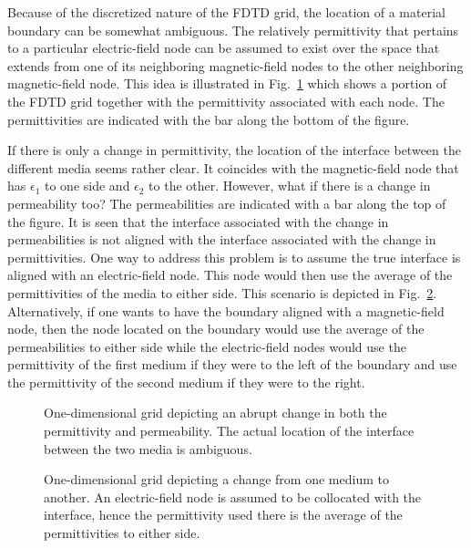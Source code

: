 Because of the discretized nature of the FDTD grid, the location of a
material boundary can be somewhat ambiguous.  The relatively
permittivity that pertains to a particular electric-field node can be
assumed to exist over the space that extends from one of its
neighboring magnetic-field nodes to the other neighboring
magnetic-field node.  This idea is illustrated in Fig.\
\ref{fig:abrupt} which shows a portion of the FDTD grid together with
the permittivity associated with each node.  The permittivities are
indicated with the bar along the bottom of the figure.  

If there is only a change in permittivity, the location of the
interface between the different media seems rather clear.  It
coincides with the magnetic-field node that has $\epsilon_1$ to one
side and $\epsilon_2$ to the other.  However, what if there is a
change in permeability too?  The permeabilities are indicated with a
bar along the top of the figure.  It is seen that the interface
associated with the change in permeabilities is not aligned with the
interface associated with the change in permittivities.  One way to
address this problem is to assume the true interface is aligned with
an electric-field node.  This node would then use the average of the
permittivities of the media to either side.  This scenario is depicted
in Fig.\ \ref{fig:average}.  Alternatively, if one wants to have the
boundary aligned with a magnetic-field node, then the node located on
the boundary would use the average of the permeabilities to either
side while the electric-field nodes would use the permittivity of the
first medium if they were to the left of the boundary and use the
permittivity of the second medium if they were to the right.

\begin{figure}
  \begin{center}
  \end{center}
  \caption{One-dimensional grid depicting an abrupt change in both the
  permittivity and permeability.  The actual location of the interface
  between the two media is ambiguous.}
  \label{fig:abrupt}
\end{figure}

\begin{figure}
  \begin{center}
  \end{center}
  \caption{One-dimensional grid depicting a change from one medium to
  another.  An electric-field node is assumed to be collocated with
  the interface, hence the permittivity used there is the average of
  the permittivities to either side.}
  \label{fig:average}
\end{figure}


